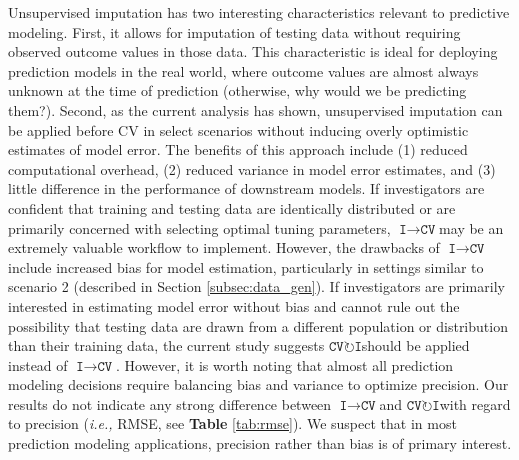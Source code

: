 \documentclass[AMA,STIX1COL,doublespace]{WileyNJD-v2}
\begin{document}
Unsupervised imputation has two interesting characteristics relevant to
predictive modeling. First, it allows for imputation of testing data
without requiring observed outcome values in those data. This
characteristic is ideal for deploying prediction models in the real
world, where outcome values are almost always unknown at the time of
prediction (otherwise, why would we be predicting them?). Second, as the
current analysis has shown, unsupervised imputation can be applied
before CV in select scenarios without inducing overly optimistic
estimates of model error. The benefits of this approach include (1)
reduced computational overhead, (2) reduced variance in model error
estimates, and (3) little difference in the performance of downstream
models. If investigators are confident that training and testing data
are identically distributed or are primarily concerned with selecting
optimal tuning parameters,
$\texttt{I}\!\!\rightarrow\!\texttt{CV}$\space may be an extremely
valuable workflow to implement. However, the drawbacks of
$\texttt{I}\!\!\rightarrow\!\texttt{CV}$\space include increased bias
for model estimation, particularly in settings similar to scenario 2
(described in Section \ref{subsec:data_gen}). If investigators are
primarily interested in estimating model error without bias and cannot
rule out the possibility that testing data are drawn from a different
population or distribution than their training data, the current study
suggests $\texttt{CV}\!\circlearrowright\!\texttt{I}$\space should be
applied instead of $\texttt{I}\!\!\rightarrow\!\texttt{CV}$. However, it
is worth noting that almost all prediction modeling decisions require
balancing bias and variance to optimize precision. Our results do not
indicate any strong difference between
$\texttt{I}\!\!\rightarrow\!\texttt{CV}$\space and
$\texttt{CV}\!\circlearrowright\!\texttt{I}$\space with regard to
precision (\textit{i.e., }RMSE, see \textbf{Table} \ref{tab:rmse}). We
suspect that in most prediction modeling applications, precision rather
than bias is of primary interest.
\end{document}

